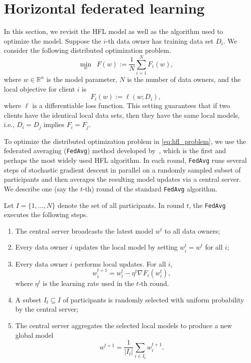 \section{Horizontal federated learning} \label{sec:7-3}
In this section, we revisit the HFL model as well as the algorithm used to optimize the model. Suppose the $i$-th data owner has training data set $D_i$. We consider the following distributed optimization problem.
\begin{equation} \label{eq:hfl_problem}
    \min_{w}\enspace F(w) := \frac{1}{N}\sum_{i = 1}^N F_i(w),
\end{equation}
where $w\in\mathbb{R}^n$ is the model parameter, $N$ is the number of data owners, and the local objective for client $i$ is
\begin{equation} \label{eq:loss}
    F_i(w) := \ell(w; D_i),
\end{equation}
where $\ell$ is a differentiable loss function. This setting guarantees that if two clients have the identical local data sets, then they have the same local models, i.e., $D_i=D_j$ implies $F_i=F_j$. 

To optimize the distributed optimization problem in \eqref{eq:hfl_problem}, we use the federated averaging (\texttt{FedAvg}) method developed by~\citet{mcmahan2017communication}, which is the first and perhaps the most widely used HFL algorithm. In each round, \texttt{FedAvg} runs several steps of stochastic gradient descent in parallel on a randomly sampled subset of participants and then averages the resulting model updates via a central server. We describe one (say the $t$-th) round of the standard \texttt{FedAvg} algorithm. 

Let $I = \{1, \dots, N\}$ denote the set of all participants. In round $t$, the \texttt{FedAvg} executes the following steps.
\begin{enumerate}
    \item The central server broadcasts the latest model $w^t$ to all data owners;
    \item Every data owner $i$ updates the local model by setting $w_i^t = w^t$ for all $i$;
    \item Every data owner $i$ performs local updates. For all $i$,
    \begin{equation} \label{eq:local_step}
        w_i^{t+1} = w_i^t - \eta^t \nabla F_i(w_i^t),
    \end{equation}
    where $\eta^t$ is the learning rate used in the $t$-th round. 
    \item A subset $I_t \subseteq I$ of participants is randomly selected with uniform probability by the central server;
    \item The central server aggregates the selected local models to produce a new global model
    \begin{equation} \label{eq:global_step}
        w^{t+1} = \frac{1}{|I_t|} \sum_{i \in I_t} w_i^{t+1}.
    \end{equation}
\end{enumerate}

